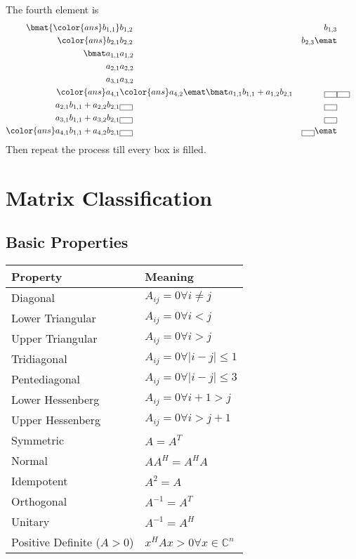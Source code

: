 The fourth element is
\begin{eqnarray*}
\bmat  %
{\color{ans}b_{1,1}} & b_{1,2} & b_{1,3} \\
{\color{ans}b_{2,1}} & b_{2,2} & b_{2,3}
\emat \\
\bmat
a_{1,1} & a_{1,2} \\
a_{2,1} & a_{2,2} \\
a_{3,1} & a_{3,2} \\
{\color{ans}a_{4,1}} & {\color{ans}a_{4,2}}
\emat
\bmat
a_{1,1}b_{1,1}+a_{1,2}b_{2,1} & \fbox{\hspace{8pt}} & \fbox{\hspace{8pt}} \\
a_{2,1}b_{1,1}+a_{2,2}b_{2,1} & \fbox{\hspace{8pt}} & \fbox{\hspace{8pt}} \\
a_{3,1}b_{1,1}+a_{3,2}b_{2,1} & \fbox{\hspace{8pt}} & \fbox{\hspace{8pt}} \\
{\color{ans}a_{4,1}b_{1,1}+a_{4,2}b_{2,1}} & \fbox{\hspace{8pt}} & \fbox{\hspace{8pt}}
\emat
\end{eqnarray*}
Then repeat the process till every box is filled.


\section{Matrix Classification}

\subsection{Basic Properties}

\begin{tabular}{ll}
Property                    & Meaning \\\hline
Diagonal                    & $A_{ij}=0 \forall i\ne j$\\
Lower Triangular            & $A_{ij}=0 \forall i<j$\\
Upper Triangular            & $A_{ij}=0 \forall i>j$\\
Tridiagonal                 & $A_{ij}=0 \forall |i-j|\le 1$\\
Pentediagonal               & $A_{ij}=0 \forall |i-j|\le 3$\\
Lower Hessenberg            & $A_{ij}=0 \forall i+1>j$\\
Upper Hessenberg            & $A_{ij}=0 \forall i>j+1$\\
Symmetric                   & $A=A^T$\\
Normal                      & $AA^H = A^HA$\\
Idempotent                  & $A^2=A$\\
Orthogonal                  & $A^{-1}=A^{T}$\\
Unitary                     & $A^{-1}=A^{H}$\\
Positive Definite ($A>0$)   & $x^HAx>0 \forall x\in\mathbb{C}^n$ \\
\end{tabular}


